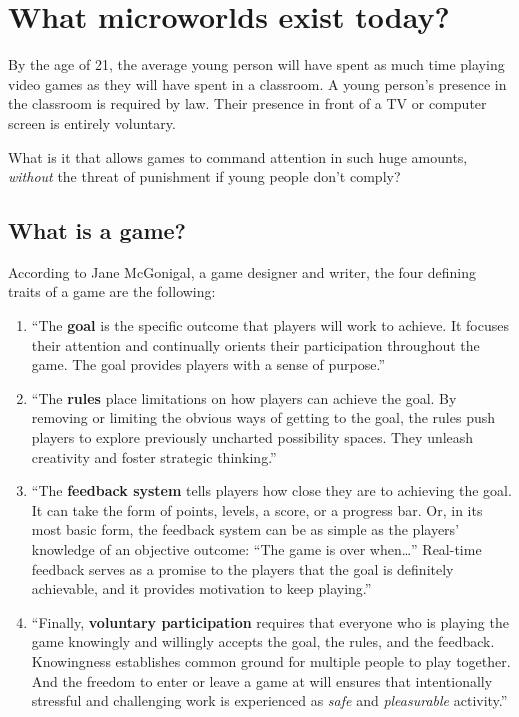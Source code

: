 \section{What microworlds exist today?}

By the age of 21, the average young person will have spent as much time
playing video games as they will have spent in a classroom\cite{ted:mcgonigal}.
A young person's presence in the classroom is required by law. Their presence in
front of a TV or computer screen is entirely voluntary.

What is it that allows games to command attention in such huge amounts, \emph{without} the threat of punishment if young people don't comply?

\subsection{What is a game?}

According to Jane McGonigal, a game designer and writer, the four
defining traits of a game are the following:

\begin{enumerate}

\item
  ``The \textbf{goal} is the specific outcome that players will work to
  achieve. It focuses their attention and continually orients their
  participation throughout the game. The goal provides players with a
  sense of purpose.''\cite{rebroken}

\item
  ``The \textbf{rules} place limitations on how players can achieve the
  goal. By removing or limiting the obvious ways of getting to the goal,
  the rules push players to explore previously uncharted possibility
  spaces. They unleash creativity and foster strategic thinking.''\cite{rebroken}

\item
  ``The \textbf{feedback system} tells players how close they are to
  achieving the goal. It can take the form of points, levels, a score,
  or a progress bar. Or, in its most basic form, the feedback system can
  be as simple as the players' knowledge of an objective outcome: ``The
  game is over when\ldots'' Real-time feedback serves as a promise to
  the players that the goal is definitely achievable, and it provides
  motivation to keep playing.''\cite{rebroken}

\item
  ``Finally, \textbf{voluntary participation} requires that everyone who
  is playing the game knowingly and willingly accepts the goal, the
  rules, and the feedback. Knowingness establishes common ground for
  multiple people to play together. And the freedom to enter or leave a
  game at will ensures that intentionally stressful and challenging work
  is experienced as \emph{safe} and \emph{pleasurable} activity.''\cite{rebroken}
  
\end{enumerate}

